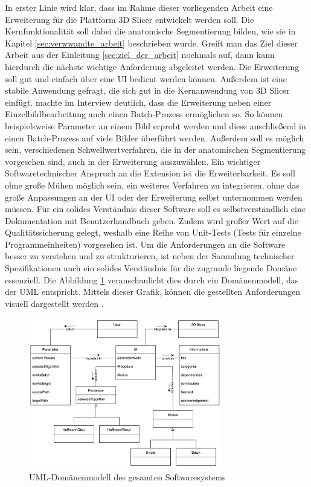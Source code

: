 In erster Linie wird klar, dass im Rahme dieser vorliegenden Arbeit eine
Erweiterung für die Plattform 3D Slicer entwickelt werden soll. Die Kernfunktionalität
soll dabei die anatomische Segmentierung bilden, wie sie in Kapitel
\ref{sec:verwwandte_arbeit} beschrieben wurde. Greift man das Ziel dieser Arbeit
aus der Einleitung \ref{sec:ziel_der_arbeit} nochmals auf, dann kann hierdurch
die nächste wichtige Anforderung abgeleitet werden. Die Erweiterung soll gut und
einfach über eine \ac{UI} bedient werden können. Außerdem ist eine stabile Anwendung
gefragt, die sich gut in die Kernanwendung von 3D Slicer einfügt. \citet[]{walter2025}
machte im Interview deutlich, dass die Erweiterung neben einer Einzelbildbearbeitung
auch einen Batch-Prozess ermöglichen so. So können beispielsweise Parameter an
einem Bild erprobt werden und diese anschließend in einen Batch-Prozess auf
viele Bilder überführt werden. Außerdem soll es möglich sein, verschiedenen
Schwellwertverfahren, die in der anatomischen Segmentierung vorgesehen sind,
auch in der Erweiterung auszuwählen. Ein wichtiger Softwaretechnischer Anspruch an
die Extension ist die Erweiterbarkeit. Es soll ohne große Mühen möglich sein, ein
weiteres Verfahren zu integrieren, ohne das große Anpassungen an der UI oder der
Erweiterung selbst unternommen werden müssen. Für ein solides Verständnis dieser
Software soll es selbstverständlich eine Dokumentation mit Benutzerhandbuch geben.
Zudem wird großer Wert auf die Qualitätssicherung gelegt, weshalb eine Reihe von
Unit-Tests (Tests für einzelne Programmeinheiten) vorgesehen ist. Um die
Anforderungen an die Software besser zu verstehen und zu strukturieren, ist neben
der Sammlung technischer Spezifikationen auch ein solides Verständnis für die zugrunde
liegende Domäne essenziell. Die Abbildung \ref{fig:3d_slicer_domäne}
veranschaulicht dies durch ein Domänenmodell, das der \ac{UML} entspricht. Mittels
dieser Grafik, können die gestellten Anforderungen visuell dargestellt werden
\citep[vgl.][]{walter2025}.

\begin{figure}[h]
	\centering
	\includegraphics[width=0.75\textwidth]{img/domaenenmodell.jpg}
	\caption{UML-Domänenmodell des gesamten Softwaresystems}
	\label{fig:3d_slicer_domäne}
\end{figure}

